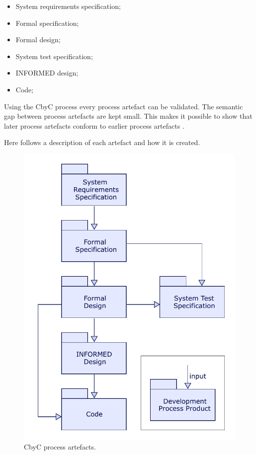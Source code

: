 \begin{itemize}
	\item System requirements specification;
	\item Formal specification;
	\item Formal design;
	\item System test specification;
	\item INFORMED design;
	\item Code;
\end{itemize}

Using the CbyC process every process artefact can be validated. The semantic gap 
between process artefacts are kept small. This makes it possible to show that later 
process artefacts conform to earlier process artefacts \parencite{Tokeneer}.

Here follows a description of each artefact and how it is created.

\begin{figure}[H]
	\centering
	\includegraphics[scale=0.75]{Figures/CbyC_process.pdf}
	\decoRule
	\caption{CbyC process artefacts.}
	\label{fig:CbyCDev}
\end{figure}

